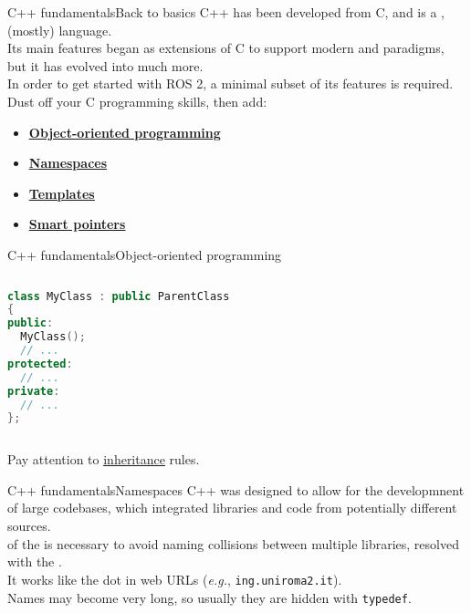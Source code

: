 \begin{frame}{C++ fundamentals}{Back to basics}
	C++ has been developed from C, and is a ,  (mostly) language.\\
	Its main features began as extensions of C to support modern  and  paradigms, but it has evolved into much more.\\
	\bigskip
	In order to get started with ROS 2, a minimal subset of its features is required.\\
	Dust off your C programming skills, then add:
	\begin{itemize}
		\item \href{https://www.geeksforgeeks.org/c-classes-and-objects/}{\color{blue}\underline{\textbf{Object-oriented programming}}}
		\item \href{https://www.geeksforgeeks.org/namespace-in-c/}{\color{blue}\underline{\textbf{Namespaces}}}
		\item \href{https://www.geeksforgeeks.org/templates-cpp/}{\color{blue}\underline{\textbf{Templates}}}
		\item \href{https://www.geeksforgeeks.org/smart-pointers-cpp/}{\color{blue}\underline{\textbf{Smart pointers}}}
	\end{itemize}
\end{frame}
\begin{frame}[fragile]{C++ fundamentals}{Object-oriented programming}
	\begin{columns}
		\begin{lstlisting}[language=C++, caption=Example of definition of a C++ class.]
class MyClass : public ParentClass
{
public:
  MyClass();
  // ...
protected:
  // ...
private:
  // ...
};\end{lstlisting}
	\end{columns}
	Pay attention to \href{https://www.geeksforgeeks.org/inheritance-in-c/}{\color{blue}\underline{inheritance}} rules.
\end{frame}
\begin{frame}{C++ fundamentals}{Namespaces}
  C++ was designed to allow for the developmnent of large codebases, which integrated libraries and code from potentially different sources.\\
  \bigskip
   of the  is necessary to avoid naming collisions between multiple libraries, resolved with the .\\
  It works like the dot in web URLs (\emph{e.g.}, \texttt{ing.uniroma2.it}).\\
  \bigskip
  Names may become very long, so usually they are hidden with \texttt{typedef}.
\end{frame}
